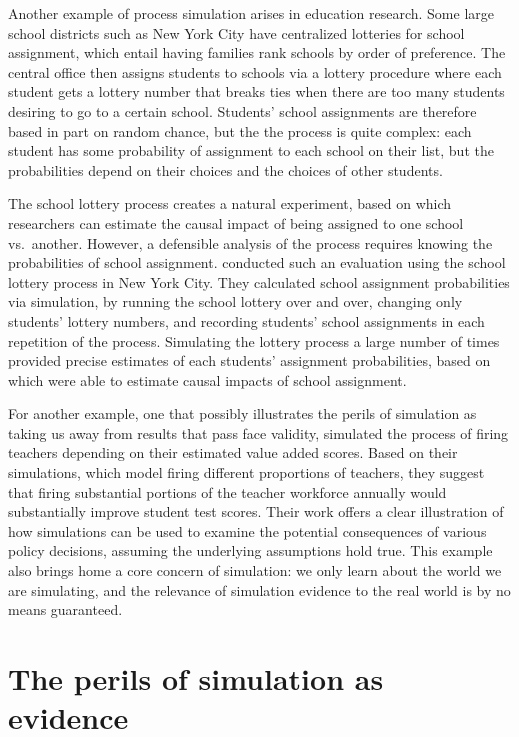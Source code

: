 \documentclass[
]{book}
\begin{document}
Another example of process simulation arises in education research.
Some large school districts such as New York City have centralized lotteries for school assignment, which entail having families rank schools by order of preference.
The central office then assigns students to schools via a lottery procedure where each student gets a lottery number that breaks ties when there are too many students desiring to go to a certain school.
Students' school assignments are therefore based in part on random chance, but the the process is quite complex: each student has some probability of assignment to each school on their list, but the probabilities depend on their choices and the choices of other students.

The school lottery process creates a natural experiment, based on which researchers can estimate the causal impact of being assigned to one school vs.~another.
However, a defensible analysis of the process requires knowing the probabilities of school assignment. \citet{abdulkadirouglu2017research} conducted such an evaluation using the school lottery process in New York City.
They calculated school assignment probabilities via simulation, by running the school lottery over and over, changing only students' lottery numbers, and recording students' school assignments in each repetition of the process.
Simulating the lottery process a large number of times provided precise estimates of each students' assignment probabilities, based on which \citet{abdulkadirouglu2017research} were able to estimate causal impacts of school assignment.

For another example, one that possibly illustrates the perils of simulation as taking us away from results that pass face validity, \citet{staiger2010searching} simulated the process of firing teachers depending on their estimated value added scores.
Based on their simulations, which model firing different proportions of teachers, they suggest that firing substantial portions of the teacher workforce annually would substantially improve student test scores.
Their work offers a clear illustration of how simulations can be used to examine the potential consequences of various policy decisions, assuming the underlying assumptions hold true.
This example also brings home a core concern of simulation: we only learn about the world we are simulating, and the relevance of simulation evidence to the real world is by no means guaranteed.

\section{The perils of simulation as evidence}\label{the-perils-of-simulation-as-evidence}
\end{document}
